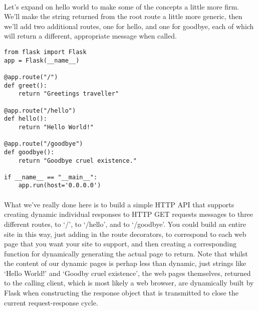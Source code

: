 \paragraph{} Let's expand on hello world to make some of the concepts a little more firm. We'll make the string returned from the root route a little more generic, then we'll add two additional routes, one for hello, and one for goodbye, each of which will return a different, appropriate message when called.

\begin{lstlisting}
from flask import Flask 
app = Flask(__name__)

@app.route("/")
def greet():
    return "Greetings traveller"

@app.route("/hello")
def hello():
    return "Hello World!"

@app.route("/goodbye")
def goodbye():
    return "Goodbye cruel existence."

if __name__ == "__main__":
    app.run(host='0.0.0.0')

\end{lstlisting}

\paragraph{} What we've really done here is to build a simple HTTP API that supports creating dynamic individual responses to HTTP GET requests messages to three different routes, to `/', to `/hello', and to `/goodbye'. You could build an entire site in this way, just adding in the route decorators, to correspond to each web page that you want your site to support, and then creating a corresponding function for dynamically generating the actual page to return. Note that whilst the content of our dynamic pages is perhap less than dynamic, just strings like `Hello World!' and `Goodby cruel existence', the web pages themselves, returned to the calling client, which is most likely a web browser, are dynamically built by Flask when constructing the response object that is transmitted to close the current request-response cycle.



